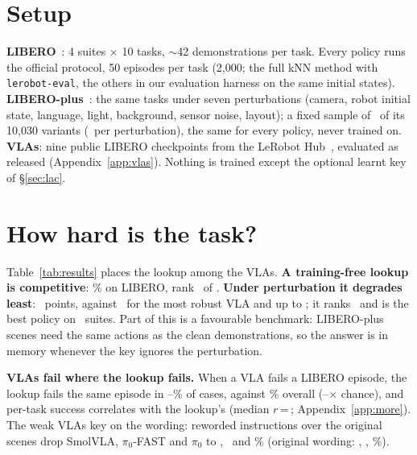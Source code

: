 \documentclass{article}
\begin{document}
\section{Setup}

\textbf{LIBERO}~\citep{liu2023libero}: 4 suites $\times$ 10 tasks, $\sim$42 demonstrations per task. Every policy runs the
official protocol, 50 episodes per task (2{,}000; the full kNN method with \texttt{lerobot-eval}, the others in our
evaluation harness on the same initial states). \textbf{LIBERO-plus}~\citep{fei2025liberoplus}: the same tasks under seven
perturbations (camera, robot initial state, language, light, background, sensor noise, layout); a fixed sample of
\PlusN\ of its 10{,}030 variants (\PlusPerCat\ per perturbation), the same for every policy, never trained on.
\textbf{VLAs}: nine public LIBERO checkpoints from the LeRobot Hub~\citep{cadene2024lerobot}, evaluated as released
(Appendix~\ref{app:vlas}). Nothing is trained except the optional learnt key of \S\ref{sec:lac}.

\section{How hard is the task?}
\label{sec:task}

\begin{table}[t]
  \centering\scriptsize\setlength{\tabcolsep}{2.5pt}
  
  \caption{Success (\%) on LIBERO (official protocol, 2{,}000 episodes) and on the same LIBERO-plus variants, ordered by
  LIBERO-plus. The kNN rows are training-free except the learnt key. Bold: best per column.}
  \label{tab:results}
\end{table}

Table~\ref{tab:results} places the lookup among the VLAs. \textbf{A training-free lookup is competitive}: \KnnAvg\% on
LIBERO, rank \KnnRankLibero\ of \RankN. \textbf{Under perturbation it degrades least}: \KnnDrop\ points, against
\MinVlaDrop\ for the most robust VLA and up to \MaxVlaDrop; it ranks \KnnRankPlus\ and is the best policy on
\KnnBestPlusSuites\ suites. Part of this is a favourable benchmark: LIBERO-plus scenes need the same actions as the clean
demonstrations, so the answer is in memory whenever the key ignores the perturbation.

\textbf{VLAs fail where the lookup fails.} When a VLA fails a LIBERO episode, the lookup fails the same episode in
\FailMin--\FailMax\% of cases, against \FailBase\% overall (\LiftMin--\LiftMax$\times$ chance), and per-task success
correlates with the lookup's (median $r$\,=\,\TaskCorrMedian; Appendix~\ref{app:more}). The weak VLAs key on the
wording: reworded instructions over the original scenes drop SmolVLA, $\pi_0$-FAST and $\pi_0$ to \PlusSmolLanguage,
\PlusFastLanguage\ and \PlusPiZeroLanguage\% (original wording: \PlusSmolCtrl, \PlusFastCtrl, \PlusPiZeroCtrl\%).
\end{document}

